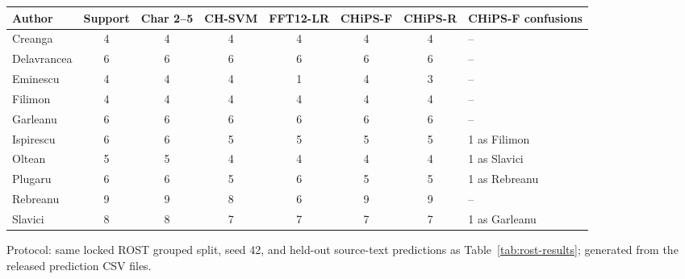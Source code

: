 \begin{table}
  {\tablefont\begin{tabular}{lccccccp{}}
    \hline
    Author & Support & Char 2--5 & CH-SVM & FFT12-LR & CHiPS-F & CHiPS-R & CHiPS-F confusions\\
    \hline
    Creanga & 4 & 4 & 4 & 4 & 4 & 4 & --\\
    Delavrancea & 6 & 6 & 6 & 6 & 6 & 6 & --\\
    Eminescu & 4 & 4 & 4 & 1 & 4 & 3 & --\\
    Filimon & 4 & 4 & 4 & 4 & 4 & 4 & --\\
    Garleanu & 6 & 6 & 6 & 6 & 6 & 6 & --\\
    Ispirescu & 6 & 6 & 5 & 5 & 5 & 5 & 1 as Filimon\\
    Oltean & 5 & 5 & 4 & 4 & 4 & 4 & 1 as Slavici\\
    Plugaru & 6 & 6 & 5 & 6 & 5 & 5 & 1 as Rebreanu\\
    Rebreanu & 9 & 9 & 8 & 6 & 9 & 9 & --\\
    Slavici & 8 & 8 & 7 & 7 & 7 & 7 & 1 as Garleanu\\
    \hline
  \end{tabular}}
  {\begin{tabnote}Protocol: same locked ROST grouped split, seed 42, and held-out source-text predictions as Table~\ref{tab:rost-results}; generated from the released prediction CSV files.\end{tabnote}}
\end{table}
